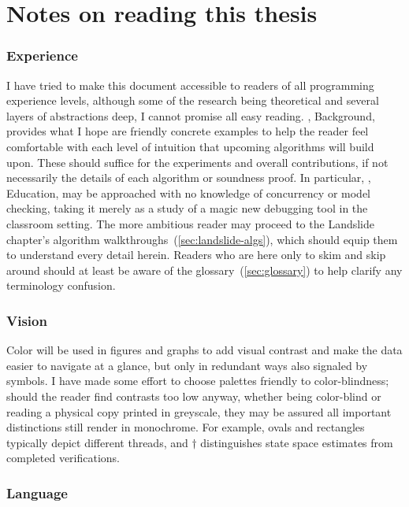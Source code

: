 \section{Notes on reading this thesis}

\subsubsection{Experience}

I have tried to make this document accessible to readers of all programming experience levels,
although some of the research being theoretical and several layers of abstractions deep,
I cannot promise all easy reading.
, Background, provides what I hope are friendly concrete examples
to help the reader feel comfortable with each level of intuition that upcoming algorithms will build upon.
These should suffice for the experiments and overall contributions,
if not necessarily the details of each algorithm or soundness proof.
In particular, , Education,
may be approached with no knowledge of concurrency or model checking,
taking it merely as a study of a magic new debugging tool in the classroom setting.
The more ambitious reader may proceed to the Landslide chapter's algorithm walkthroughs~(\cref{sec:landslide-algs}),
which should equip them to understand every detail herein.
Readers who are here only to skim and skip around should at least be aware of the glossary~(\cref{sec:glossary})
to help clarify any terminology confusion.

\subsubsection{Vision}

Color will be used in figures and graphs to add visual contrast and make the data easier to navigate at a glance,
but only in redundant ways also signaled by symbols.
I have made some effort to choose palettes friendly to color-blindness;
should the reader find contrasts too low anyway,
whether being color-blind or reading a physical copy printed in greyscale,
they may be assured all important distinctions still render in monochrome.
For example, ovals and rectangles typically depict different threads,
and $\dagger$ distinguishes state space estimates from completed verifications.

\subsubsection{Language}

